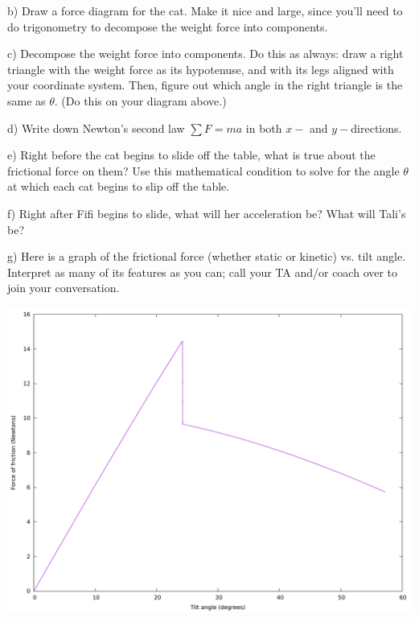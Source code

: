 \documentclass[12pt]{article}
\begin{document}
\vspace{2in}
\newpage

b) Draw a force diagram for the cat. Make it nice and large, since you'll need to do trigonometry to decompose the 
weight force into components.

\vspace{3in}


c) Decompose the weight force into components. Do this as always: draw a right triangle with the weight force as its 
hypotenuse, and with its legs aligned with your coordinate system. Then, figure out which angle in the right triangle
is the same as $\theta$. (Do this on your diagram above.)

d) Write down Newton's second law $\sum F = ma$ in both $x-$ and $y-$directions. 

\vspace{2in}

e) Right before the cat begins to slide off the table, what is true about the frictional force on them? Use this 
mathematical condition to solve for the angle $\theta$ at which each cat begins to slip off the table.

\vspace{2in}

f) Right after Fifi begins to slide, what will her acceleration be? What will Tali's be?

\vspace{3in}

g) Here is a graph of the frictional force (whether static or kinetic) vs. tilt angle. Interpret as many of its features as you
can; call your TA and/or coach over to join your conversation.

\begin{center}
\includegraphics[width=.9\textwidth]{tilt.pdf}
\end{center}
\end{document}
